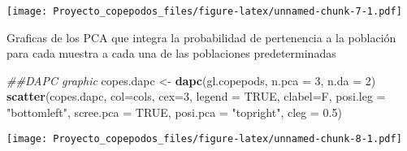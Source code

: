 \documentclass[]{article}
\newenvironment{Shaded}{\begin{snugshade}}{\end{snugshade}}
\newcommand{\CommentTok}[1]{\textcolor[rgb]{0.56,0.35,0.01}{\textit{#1}}}
\newcommand{\DataTypeTok}[1]{\textcolor[rgb]{0.13,0.29,0.53}{#1}}
\newcommand{\DecValTok}[1]{\textcolor[rgb]{0.00,0.00,0.81}{#1}}
\newcommand{\FloatTok}[1]{\textcolor[rgb]{0.00,0.00,0.81}{#1}}
\newcommand{\KeywordTok}[1]{\textcolor[rgb]{0.13,0.29,0.53}{\textbf{#1}}}
\newcommand{\NormalTok}[1]{#1}
\newcommand{\OtherTok}[1]{\textcolor[rgb]{0.56,0.35,0.01}{#1}}
\newcommand{\StringTok}[1]{\textcolor[rgb]{0.31,0.60,0.02}{#1}}
\begin{document}
\texttt{[image: Proyecto\_copepodos\_files/figure-latex/unnamed-chunk-7-1.pdf]}

Graficas de los PCA que integra la probabilidad de pertenencia a la
población para cada muestra a cada una de las poblaciones
predeterminadas

\begin{Shaded}
\begin{Highlighting}[]
\CommentTok{##DAPC graphic}
\NormalTok{copes.dapc <-}\StringTok{ }\KeywordTok{dapc}\NormalTok{(gl.copepods, }\DataTypeTok{n.pca =} \DecValTok{3}\NormalTok{, }\DataTypeTok{n.da =} \DecValTok{2}\NormalTok{)}
\KeywordTok{scatter}\NormalTok{(copes.dapc, }\DataTypeTok{col=}\NormalTok{cols, }\DataTypeTok{cex=}\DecValTok{3}\NormalTok{, }\DataTypeTok{legend =} \OtherTok{TRUE}\NormalTok{, }\DataTypeTok{clabel=}\NormalTok{F, }\DataTypeTok{posi.leg =} \StringTok{"bottomleft"}\NormalTok{, }\DataTypeTok{scree.pca =} \OtherTok{TRUE}\NormalTok{, }\DataTypeTok{posi.pca =} \StringTok{"topright"}\NormalTok{, }\DataTypeTok{cleg =} \FloatTok{0.5}\NormalTok{)}
\end{Highlighting}
\end{Shaded}

\texttt{[image: Proyecto\_copepodos\_files/figure-latex/unnamed-chunk-8-1.pdf]}
\end{document}
